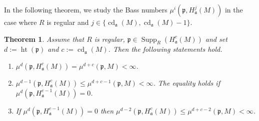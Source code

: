 \documentclass[12pt,twoside, final]{amsart}
\numberwithin{equation}{section}
\newtheorem{thm}{Theorem}[section]
\newtheorem{nota rem}[thm]{Notation and Remark}
\newtheorem{defen rem}[thm]{Definition and Remark}
\def\hei{\operatorname{ht}}
\def\cd{\operatorname{cd}}
\def\Supp{\operatorname{Supp}}
\newcommand{\p}{\mathfrak{p}}
\newcommand{\fa}{\mathfrak{a}}
\begin{document}
 In the following theorem, we study the Bass numbers  $\mu^i(\p, H^j_{\fa}(M))$ in the case where $R$ is regular and $j\in \{\cd_{\fa}(M), \cd_{\fa}(M)- 1\}$.
\begin{thm}\label{reg}
    Assume that $R$ is regular, $\p\in \Supp_R(H^c_{\fa}(M))$ and set $d:= \hei(\p)$ and $c:= \cd_{\fa}(M)$. Then the following statements hold.
    \begin{enumerate}
        \item $\mu^d(\p, H^c_{\fa}(M))= \mu^{d+ c}(\p, M)< \infty$.\label{d,c}
        \item $\mu^{d- 1}(\p, H^c_{\fa}(M))\leq  \mu^{d+ c- 1}(\p, M)< \infty$.   The equality holds if $\mu^d(\p, H^{c- 1}_{\fa}(M))= 0$.\label{d-1,c}
        \item If $\mu^d(\p, H^{c- 1}_{\fa}(M))= 0$ then $\mu^{d- 2}(\p, H^c_{\fa}(M))\leq \mu^{d+ c- 2}(\p, M)< \infty$.\label{d,c-1}
           \end{enumerate}
\end{thm}
\end{document}

